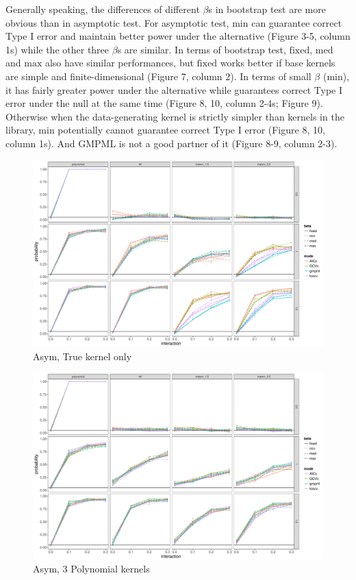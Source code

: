 \documentclass[article]{jss}
\begin{document}
\begin{appendix}
Generally speaking, the differences of different $\beta$s in bootstrap test are more obvious than in asymptotic test. For asymptotic test, $\mbox{min}$ can guarantee correct Type I error and maintain better power under the alternative (Figure 3-5, column 1s) while the other three $\beta$s are similar. In terms of bootstrap test, $\mbox{fixed}$, $\mbox{med}$ and $\mbox{max}$ also have similar performances, but $\mbox{fixed}$ works better if base kernels are simple and finite-dimensional (Figure 7, column 2). In terms of small $\beta$ ($\mbox{min}$), it has fairly greater power under the alternative while guarantees correct Type I error under the null at the same time (Figure 8, 10, column 2-4s; Figure 9). Otherwise when the data-generating kernel is strictly simpler than kernels in the library, $\mbox{min}$ potentially cannot guarantee correct Type I error (Figure 8, 10, column 1s). And GMPML is not a good partner of it (Figure 8-9, column 2-3).


\clearpage
\begin{figure}
\begin{center}
\includegraphics[width=0.9\columnwidth]{exp_A1} 
\caption{Asym, True kernel only}
\label{fig:res}
\end{center}
\end{figure}

\begin{figure}
\begin{center}
\includegraphics[width=0.9\columnwidth]{exp_A2} 
\caption{Asym, 3 Polynomial kernels}
\label{fig:res}
\end{center}
\end{figure}


\end{appendix}
\end{document}
